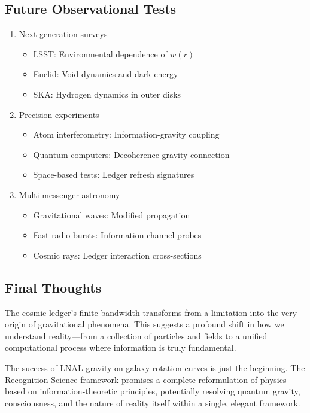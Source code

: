 \documentclass[12pt,letterpaper]{article}
\begin{document}
\subsection{Future Observational Tests}

\begin{enumerate}
\item Next-generation surveys
\begin{itemize}
\item LSST: Environmental dependence of $w(r)$
\item Euclid: Void dynamics and dark energy
\item SKA: Hydrogen dynamics in outer disks
\end{itemize}

\item Precision experiments
\begin{itemize}
\item Atom interferometry: Information-gravity coupling
\item Quantum computers: Decoherence-gravity connection
\item Space-based tests: Ledger refresh signatures
\end{itemize}

\item Multi-messenger astronomy
\begin{itemize}
\item Gravitational waves: Modified propagation
\item Fast radio bursts: Information channel probes
\item Cosmic rays: Ledger interaction cross-sections
\end{itemize}
\end{enumerate}

\subsection{Final Thoughts}

The cosmic ledger's finite bandwidth transforms from a limitation into the very origin of gravitational phenomena. This suggests a profound shift in how we understand reality---from a collection of particles and fields to a unified computational process where information is truly fundamental.

The success of LNAL gravity on galaxy rotation curves is just the beginning. The Recognition Science framework promises a complete reformulation of physics based on information-theoretic principles, potentially resolving quantum gravity, consciousness, and the nature of reality itself within a single, elegant framework.
\end{document}
